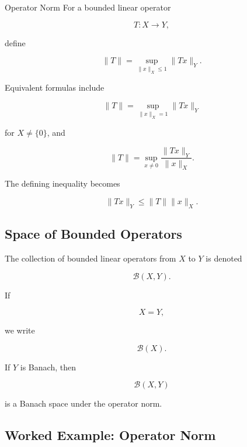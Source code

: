\begin{definitionbox}{Operator Norm}
For a bounded linear operator

\[
T:X\to Y,
\]

define

\[
\boxed{
\|T\|
=
\sup_{\|x\|_X\leq1}
\|Tx\|_Y.
}
\]
\end{definitionbox}

Equivalent formulas include

\[
\boxed{
\|T\|
=
\sup_{\|x\|_X=1}\|Tx\|_Y
}
\]

for \(X\neq\{0\}\), and

\[
\boxed{
\|T\|
=
\sup_{x\neq0}
\frac{\|Tx\|_Y}{\|x\|_X}.
}
\]

The defining inequality becomes

\[
\boxed{
\|Tx\|_Y
\leq
\|T\|\|x\|_X.
}
\]

\subsection{Space of Bounded Operators}
\label{subsec:bounded-operator-space}

The collection of bounded linear operators from \(X\) to \(Y\) is denoted

\[
\boxed{
\mathcal{B}(X,Y).
}
\]

If

\[
X=Y,
\]

we write

\[
\boxed{
\mathcal{B}(X).
}
\]

If \(Y\) is Banach, then

\[
\boxed{
\mathcal{B}(X,Y)
}
\]

is a Banach space under the operator norm.

\subsection{Worked Example: Operator Norm}
\label{subsec:worked-operator-norm}

